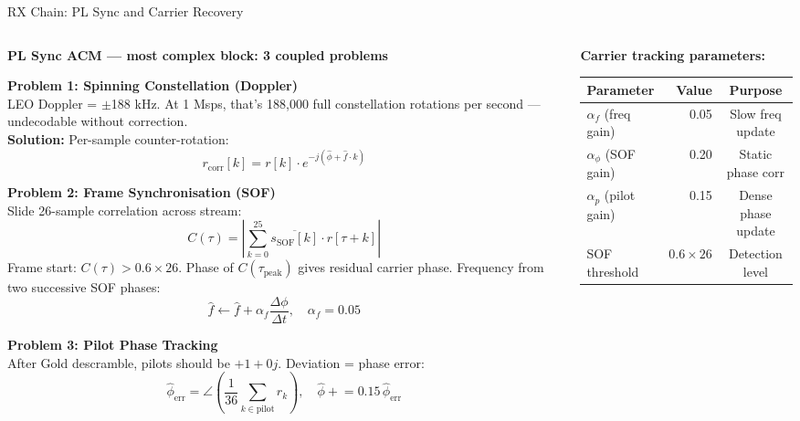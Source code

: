 \documentclass[aspectratio=169,10pt]{beamer}
\begin{document}
\begin{frame}[shrink=25]{RX Chain: PL Sync and Carrier Recovery}
  \begin{columns}[T]
    \begin{column}{0.50\textwidth}
      \textbf{PL Sync ACM — most complex block: 3 coupled problems}
      \vspace{0.2em}

      \textbf{Problem 1: Spinning Constellation (Doppler)}\\
      \scriptsize LEO Doppler = $\pm$188 kHz. At 1 Msps, that's 188,000 full
      constellation rotations per second — undecodable without correction.\\
      \textbf{Solution:} Per-sample counter-rotation:
      \[r_\text{corr}[k] = r[k] \cdot e^{-j(\hat{\phi} + \hat{f}\cdot k)}\]

      \vspace{0.2em}
      \textbf{Problem 2: Frame Synchronisation (SOF)}\\
      \scriptsize Slide 26-sample correlation across stream:
      \[C(\tau) = \left|\sum_{k=0}^{25} \overline{s_\text{SOF}[k]}\cdot r[\tau+k]\right|\]
      Frame start: $C(\tau) > 0.6\times26$.
      Phase of $C(\tau_\text{peak})$ gives residual carrier phase.
      Frequency from two successive SOF phases:
      \[\hat{f} \leftarrow \hat{f} + \alpha_f \frac{\Delta\phi}{\Delta t}, \quad \alpha_f=0.05\]

      \vspace{0.2em}
      \textbf{Problem 3: Pilot Phase Tracking}\\
      \scriptsize After Gold descramble, pilots should be $+1+0j$. Deviation = phase error:
      \[\hat{\phi}_\text{err} = \angle\!\left(\frac{1}{36}\sum_{k\in\text{pilot}} r_k\right), \quad
        \hat{\phi} \mathrel{+}= 0.15\,\hat{\phi}_\text{err}\]
    \end{column}
    \begin{column}{0.46\textwidth}
      \textbf{Carrier tracking parameters:}
      {\scriptsize
      \begin{tabular}{lrc}
        \toprule
        \textbf{Parameter} & \textbf{Value} & \textbf{Purpose}\\
        \midrule
        $\alpha_f$ (freq gain)   & 0.05  & Slow freq update\\
        $\alpha_\phi$ (SOF gain) & 0.20  & Static phase corr\\
        $\alpha_p$ (pilot gain)  & 0.15  & Dense phase update\\
        SOF threshold            & $0.6\times26$ & Detection level\\
        \bottomrule
      \end{tabular}}


\end{column}
\end{columns}
\end{frame}
\end{document}
